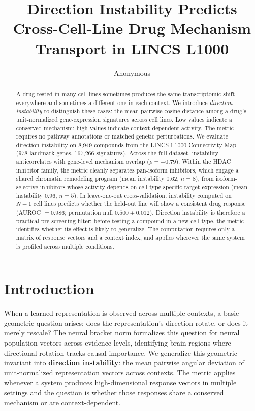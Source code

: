 \documentclass{article}
\title{Direction Instability Predicts Cross-Cell-Line Drug Mechanism Transport in LINCS L1000}
\author{Anonymous}
\begin{document}
\maketitle

\begin{abstract}
A drug tested in many cell lines sometimes produces the same
transcriptomic shift everywhere and sometimes a different one in
each context. We introduce \emph{direction instability} to
distinguish these cases: the mean pairwise cosine distance among a
drug's unit-normalized gene-expression signatures across cell lines.
Low values indicate a conserved mechanism; high values indicate
context-dependent activity. The metric requires no pathway annotations
or matched genetic perturbations.
We evaluate direction instability on 8{,}949 compounds from the
LINCS L1000 Connectivity Map (978 landmark genes, 167{,}266 signatures).
Across the full dataset, instability anticorrelates with gene-level
mechanism overlap ($\rho = -0.79$). Within the HDAC inhibitor family,
the metric cleanly separates pan-isoform inhibitors, which engage a
shared chromatin remodeling program (mean instability 0.62, $n=8$),
from isoform-selective inhibitors whose activity depends on
cell-type-specific target expression (mean instability 0.96, $n=5$).
In leave-one-out cross-validation, instability computed on $N{-}1$
cell lines predicts whether the held-out line will show a consistent
drug response (AUROC $= 0.986$; permutation null $0.500 \pm 0.012$).
Direction instability is therefore a practical pre-screening filter:
before testing a compound in a new cell type, the metric identifies
whether its effect is likely to generalize.
The computation requires only a matrix of response vectors and a
context index, and applies wherever the same system is profiled
across multiple conditions.
\end{abstract}

\section{Introduction}

When a learned representation is observed across multiple contexts, a
basic geometric question arises: does the representation's direction
rotate, or does it merely rescale? The neural bracket norm
\citep{tower2026bracket} formalizes this question for neural population
vectors across evidence levels, identifying brain regions where
directional rotation tracks causal importance. We generalize this
geometric invariant into \textbf{direction instability}: the mean
pairwise angular deviation of unit-normalized representation vectors
across contexts. The metric applies whenever a system produces
high-dimensional response vectors in multiple settings and the question
is whether those responses share a conserved mechanism or are
context-dependent.
\end{document}
